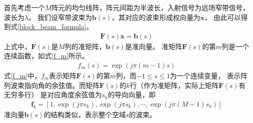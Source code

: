 \documentclass[master]{thesis-uestc}
\begin{document}
首先考虑一个$M$阵元的均匀线阵，阵元间距为半波长，入射信号为远场窄带信号，波长为$\lambda$。
我们设窄带波束为$\bm{b}(s)$，其对应的波束形成权向量为$\bm{x}$，
由此可以得到式\eqref{block_beam_formula}。
\begin{equation}\label{block_beam_formula}
    \begin{aligned}
        \bm{F}(s)\bm{x} = \bm{b}(s)
    \end{aligned}
\end{equation}
上式中，$\bm{F}(s)$是$M$列的准矩阵，$\bm{b}(s)$是准向量。
准矩阵$\bm{F}(s)$的第$m$列是一个连续函数，如式\eqref{f_m}所示。
\begin{equation}\label{f_m}
    \begin{aligned}
        f_m(s) = \exp\left(j\pi(m-1)s\right)
    \end{aligned}
\end{equation}
式\eqref{f_m}中，$f_m$表示矩阵$\bm{F}(s)$的第$m$列，而$-1\le s \le 1$为一个连续变量，
表示阵列波束指向角的余弦值。而矩阵$\bm{F}(s)$的$k$行（作为准矩阵，实际上矩阵$\bm{F}(s)$有无穷多行）
是对应角度余弦值为$s_k$的导向向量，即
\begin{equation}\label{f_k}
    \begin{aligned}
        \bm{f}_k = \left[1, \exp\left(j\pi s_k\right), \exp\left(j\pi s_k\right), \cdots,
                   \exp\left(j\pi(M-1)s_k\right)
                   \right]
    \end{aligned}
\end{equation}
准向量$\bm{b}(s)$的结构类似，表示整个空域$s$的波束。
\end{document}
